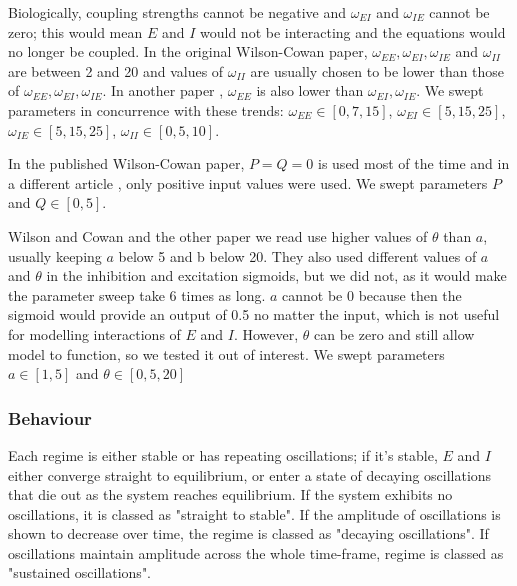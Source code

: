 \documentclass[10pt]{article}
\begin{document}
\begin{flushleft}
Biologically, coupling strengths cannot be negative and $\omega_{EI}$ and $\omega_{IE}$ cannot be zero; this would mean $E$ and $I$ would not be interacting and the equations would no longer be coupled. In the original Wilson-Cowan paper\cite{hi}, $\omega_{EE}, \omega_{EI}, \omega_{IE}$ and $\omega_{II}$ are between 2 and 20 and values of $\omega_{II}$ are usually chosen to be lower than those of $\omega_{EE}, \omega_{EI}, \omega_{IE}$. In another paper \cite{gov}, $\omega_{EE}$ is also lower than $\omega_{EI}, \omega_{IE}$. We swept parameters in concurrence with these trends: $\omega_{EE} \in [0, 7, 15]$, $\omega_{EI} \in [5,15,25]$, $\omega_{IE} \in [5,15,25]$, $\omega_{II} \in [0,5,10]$.
\newline

In the published Wilson-Cowan paper\cite{hi}, $P = Q = 0$ is used most of the time and in a different article \cite{gov}, only positive input values were used. We swept parameters $P$ and $Q \in [0, 5]$.
\newline

Wilson and Cowan\cite{hi} and the other paper we read\cite{gov} use higher values of $\theta$ than $a$, usually keeping $a$ below 5 and b below 20. They also used different values of $a$ and $\theta$ in the inhibition and excitation sigmoids, but we did not, as it would make the parameter sweep take 6 times as long. $a$ cannot be 0 because then the sigmoid would provide an output of 0.5 no matter the input, which is not useful for modelling interactions of $E$ and $I$. However, $\theta$ can be zero and still allow model to function, so we tested it out of interest. We swept parameters $a \in [1, 5]$ and $\theta \in [0,5,20]$
\newline

\subsubsection{Behaviour}

Each regime is either stable or has repeating oscillations; if it's stable, $E$ and $I$ either converge straight to equilibrium, or enter a state of decaying oscillations that die out as the system reaches equilibrium. If the system exhibits no oscillations, it is classed as "straight to stable". If the amplitude of oscillations is shown to decrease over time, the regime is classed as "decaying oscillations". If oscillations maintain amplitude across the whole time-frame, regime is classed as "sustained oscillations". 
\newline


\end{flushleft}
\end{document}
